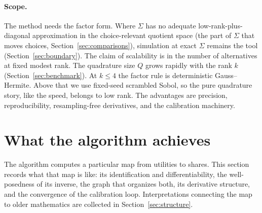 \documentclass[12pt]{article}
\theoremstyle{remark}
\begin{document}
\paragraph{Scope.} The method needs the factor form. Where $\Sigma$ has no
adequate low-rank-plus-diagonal approximation in the choice-relevant
quotient space (the part of $\Sigma$ that moves choices,
Section~\ref{sec:comparisons}), simulation at exact $\Sigma$ remains the tool
(Section~\ref{sec:boundary}). The claim of scalability is in the
number of alternatives at fixed modest rank. The quadrature size $Q$
grows rapidly with the rank $k$ (Section~\ref{sec:benchmark}). At $k
\le 4$ the factor rule is deterministic Gauss--Hermite. Above that we
use fixed-seed scrambled Sobol, so the pure quadrature story, like the
speed, belongs to low rank. The
advantages are precision,
reproducibility, resampling-free derivatives, and the calibration
machinery.

\section{What the algorithm achieves}\label{sec:theory}

The algorithm computes a particular map from utilities to shares. This
section records what that map is like: its identification and
differentiability, the well-posedness of its inverse, the graph that
organizes both, its derivative structure, and the convergence of the
calibration loop. Interpretations connecting the map to older
mathematics are collected in Section~\ref{sec:structure}.
\end{document}
